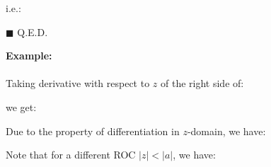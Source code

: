 \begin{itemize}
\begin{dem}
		i.e.:
		
		\begin{flushright}
			$\blacksquare$  Q.E.D.
		\end{flushright}
		\end{dem}
		\begin{tcolorbox}[colframe=black,colback=white,sharp corners]
		\textbf{{\Large {}}Example:}\\\\
		Taking derivative with respect to $z$ of the right side of:
		
		we get:
		
		Due to the property of differentiation in $z$-domain, we have:
		
		Note that for a different ROC $|z|<|a|$, we have:
		
		\end{tcolorbox} 
	\end{itemize}
	
